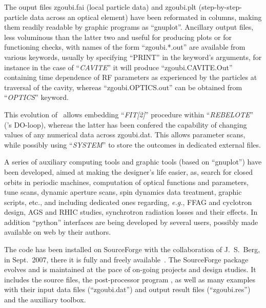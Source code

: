 \bigskip

\noindent The ouput files zgoubi.fai (local particle data) and zgoubi.plt (step-by-step-particle data across an optical element)
have been reformated in columns, making them readily readable by graphic programs as ``gnuplot''. Ancillary 
output files, less voluminous than the latter two and useful for producing plots or for functioning checks,
with names of the form ``zgoubi.*.out''  are available from various keywords, 
usually by specifying ``PRINT'' in the keyword's arguments, for instance in the case of ``\textsl{CAVITE}'' it 
will produce ``zgoubi.CAVITE.Out'' containing time dependence of RF parameters as experienced by the particles at 
traversal of the cavity, whereas ``zgoubi.OPTICS.out'' can be obtained from ``\textsl{OPTICS}'' keyword.

\bigskip

\noindent This evolution of \zgoubi\ allows embedding  ``\textsl{FIT[2]}'' procedure within ``\textsl{REBELOTE}'' 
(\zgoubi's DO-loop), whereas the latter has been confered the capability of changing values of any numerical data 
across zgoubi.dat. This allows parameter scans, while possibly using ``\textsl{SYSTEM}'' to store  the 
outcomes in dedicated external files. 

\bigskip

\noindent A series of auxiliary computing tools and graphic tools (based on ``gnuplot'') have been developed, 
 aimed at making the designer's life easier, as, 
 search for closed orbits  in periodic machines, computation of optical functions and parameters, 
tune scans, dynamic aperture scans,   spin dynamics data treatment, 
 graphic scripts, etc., and including dedicated ones regarding, \emph{e.g.}, FFAG and cyclotron design, 
AGS and RHIC studies, synchrotron radiation losses and their effects. 
In addition ``python'' interfaces are being developed by several users,  possibly made available on web 
by their authors. 

\bigskip

\noindent The code has been installed on SourceForge with the collaboration of J.~S.~Berg, in Sept.~2007, 
there it is fully and freely available~\cite{SFZ}. The SourceForge package evolves and is maintained at the 
pace of on-going projects and design studies.   It includes the source files, 
the post-processor program \zpop, as well as many examples with their  input 
data files (``zgoubi.dat'') and  output result files (``zgoubi.res'') and the auxiliary toolbox. 

